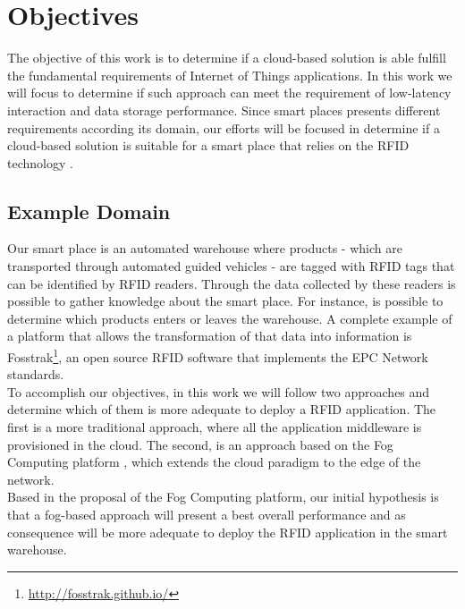 \section{Objectives}
\label{section:objectives}
The objective of this work is to determine if a cloud-based solution is able fulfill the fundamental
requirements of Internet of Things applications. In this work we will focus to determine if such approach
can meet the requirement of low-latency interaction and data storage performance. Since smart places
presents different requirements according its domain, our efforts will be focused in determine if a
cloud-based solution is suitable for a smart place that relies on the RFID technology \cite{want2006introduction}.\\

\subsection{Example Domain}
\label{sub:domain}
Our smart place is an automated warehouse where products - which are transported through automated
guided vehicles - are tagged with \gls{RFID} tags that can be identified by \gls{RFID} readers.
Through the data collected by these readers is possible to gather knowledge about the smart place.
For instance, is possible to determine which products enters or leaves the warehouse. A complete example
of a platform that allows the transformation of that data into information is Fosstrak\footnote{\url{http://fosstrak.github.io/}},
an open source \gls{RFID} software that implements the \gls{EPC} Network standards.\\

To accomplish our objectives, in this work we will follow two approaches and determine which of them
is more adequate to deploy a \gls{RFID} application. The first is a more traditional approach, where
all the application middleware is provisioned in the cloud. The second, is an approach based on the
Fog Computing platform \cite{bonomi2012fog}, which extends the cloud paradigm to the edge of the
network.\\

Based in the proposal of the Fog Computing platform, our initial hypothesis is that a fog-based approach
will present a best overall performance and as consequence will be more adequate to deploy the \gls{RFID}
application in the smart warehouse.

